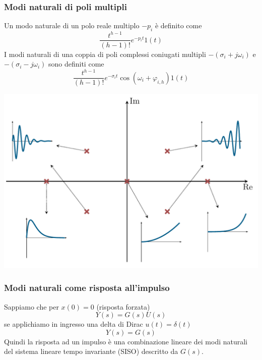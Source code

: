 \documentclass{article}
\numberwithin{equation}{subsection}
\begin{document}
\subsubsection{Modi naturali di poli multipli}
Un modo naturale di un polo reale multiplo $-p_i$ è definito come
\begin{equation}
    \frac{t^{h-1}}{(h-1)!} e^{-p_i t} 1(t)
\end{equation}
I modi naturali di una coppia di poli complessi coniugati multipli $-(\sigma_i + j \omega_i)$ e $-(\sigma_i - j \omega_i)$ sono definiti come
\begin{equation}
    \frac{t^{h-1}}{(h-1)!} e^{-\sigma_i t} \cos(\omega_i + \varphi_{i,h}) 1(t)
\end{equation}
\begin{center}
    \includegraphics[scale=0.2]{Images/Modi_naturali_poli_multipli.png}
\end{center}


\subsubsection{Modi naturali come risposta all'impulso}
Sappiamo che per $x(0)=0$ (risposta forzata)
\[
    Y(s) = G(s) U(s)
\]  
se applichiamo in ingresso una delta di Dirac $u(t)=\delta(t)$
\[
    Y(s) = G(s)    
\]
Quindi la risposta ad un impulso è una combinazione lineare dei modi naturali del sistema lineare tempo invariante (SISO) descritto da $G(s)$.
\end{document}
